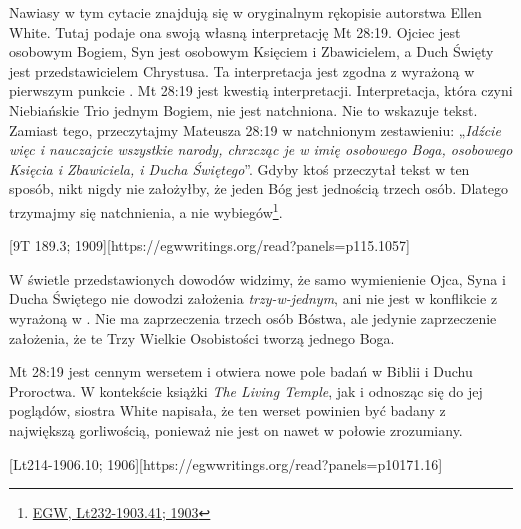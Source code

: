 Nawiasy w tym cytacie znajdują się w oryginalnym rękopisie autorstwa Ellen White. Tutaj podaje ona swoją własną interpretację Mt 28:19. Ojciec jest osobowym Bogiem, Syn jest osobowym Księciem i Zbawicielem, a Duch Święty jest przedstawicielem Chrystusa. Ta interpretacja jest zgodna z  wyrażoną w pierwszym punkcie . Mt 28:19 jest kwestią interpretacji. Interpretacja, która czyni Niebiańskie Trio jednym Bogiem, nie jest natchniona. Nie to wskazuje tekst. Zamiast tego, przeczytajmy Mateusza 28:19 w natchnionym zestawieniu: „\textit{Idźcie więc i nauczajcie wszystkie narody, chrzcząc je w imię osobowego Boga, osobowego Księcia i Zbawiciela, i Ducha Świętego}”. Gdyby ktoś przeczytał tekst w ten sposób, nikt nigdy nie założyłby, że jeden Bóg jest jednością trzech osób. Dlatego trzymajmy się natchnienia, a nie wybiegów\footnote{\href{https://egwwritings.org/?ref=en\_Lt232-1903.41&para=10197.50}{{EGW, Lt232-1903.41; 1903}}}.

[9T 189.3; 1909][https://egwwritings.org/read?panels=p115.1057]

W świetle przedstawionych dowodów widzimy, że samo wymienienie Ojca, Syna i Ducha Świętego nie dowodzi założenia \textit{trzy-w-jednym}, ani nie jest w konflikcie z  wyrażoną w . Nie ma zaprzeczenia trzech osób Bóstwa, ale jedynie zaprzeczenie założenia, że te Trzy Wielkie Osobistości tworzą jednego Boga.

Mt 28:19 jest cennym wersetem i otwiera nowe pole badań w Biblii i Duchu Proroctwa. W kontekście książki \textit{The Living Temple}, jak i odnosząc się do jej poglądów, siostra White napisała, że ten werset powinien być badany z największą gorliwością, ponieważ nie jest on nawet w połowie zrozumiany.

[Lt214-1906.10; 1906][https://egwwritings.org/read?panels=p10171.16]

